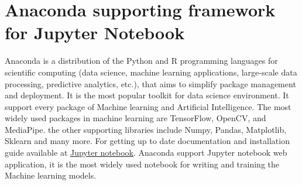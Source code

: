 %
%



\section{Anaconda supporting framework for Jupyter Notebook}

Anaconda is a distribution of the Python and R programming languages for scientific computing (data science, machine learning applications, large-scale data processing, predictive analytics, etc.), that aims to simplify package management and deployment. It is the most popular toolkit for data science environment. It support every package of Machine learning and Artificial Intelligence. The most widely used packages in machine learning are TensorFlow, OpenCV, and MediaPipe. the other supporting libraries include Numpy, Pandas, Matplotlib, Sklearn and many more. For getting up to date documentation and installation guide available at \href{https://www.anaconda.com/products/individual}{Jupyter notebook}. Anaconda support Jupyter notebook web application, it is the most widely used notebook for writing and training the Machine learning models.

